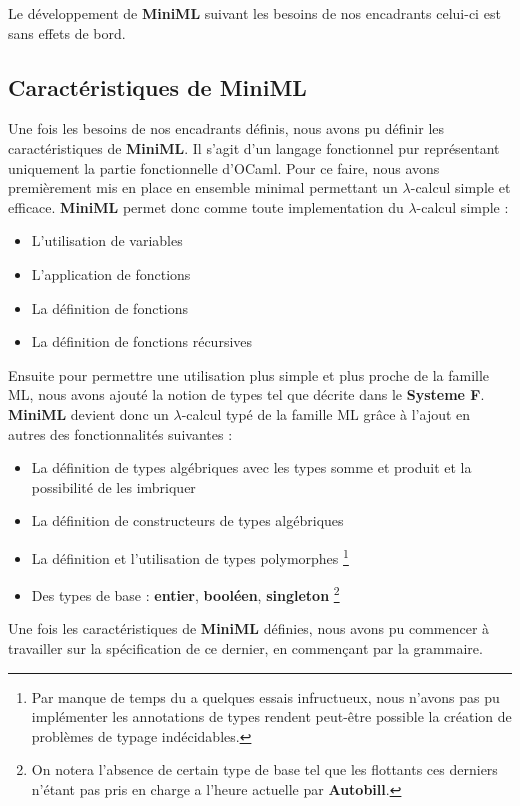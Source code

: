 \documentclass[12pt]{article}
\begin{document}
Le développement de \textbf{MiniML} suivant les besoins de nos
encadrants celui-ci est sans effets de bord.

\hypertarget{Caracteristiques-de-miniml}{%
      \subsection{Caractéristiques de MiniML}\label{Caracteristiques-de-miniml}}

Une fois les besoins de nos encadrants définis, nous avons pu définir les caractéristiques de \textbf{MiniML}.
Il s'agit d'un langage fonctionnel pur représentant uniquement la partie fonctionnelle d'OCaml.
Pour ce faire, nous avons premièrement mis en place en ensemble minimal permettant un $\lambda$-calcul simple et efficace.
\textbf{MiniML} permet donc comme toute implementation du $\lambda$-calcul simple :
\begin{itemize}
      \item L'utilisation de variables
      \item L'application de fonctions
      \item La définition de fonctions
      \item La définition de fonctions récursives
\end{itemize}
Ensuite pour permettre une utilisation plus simple et plus proche de la famille ML, nous avons ajouté la notion de types tel que décrite dans le \textbf{Systeme F}\cite{SystemF}.\\
\textbf{MiniML} devient donc un $\lambda$-calcul typé de la famille ML grâce à l'ajout en autres des fonctionnalités suivantes :
\begin{itemize}
      \item La définition de types algébriques avec les types somme et produit et la possibilité de les imbriquer
      \item La définition de constructeurs de types algébriques
      \item La définition et l'utilisation de types polymorphes \footnote{Par manque de temps du a quelques essais infructueux, nous n'avons pas pu implémenter les annotations de types rendent peut-être possible la création de problèmes de typage indécidables.}
      \item Des types de base : \textbf{entier}, \textbf{booléen}, \textbf{singleton}
            \footnote{On notera l'absence de certain type de base tel que les flottants ces derniers n'étant pas pris en charge a l'heure actuelle par \textbf{Autobill}.}
\end{itemize}
\hfill \break
Une fois les caractéristiques de \textbf{MiniML} définies, nous avons pu commencer à travailler sur la spécification de ce dernier, en commençant par la grammaire.
\hfill \break
\pagebreak
\end{document}
